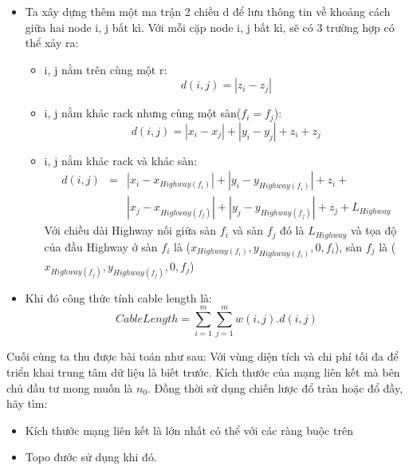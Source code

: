 \documentclass[../report.tex]{subfiles}
\begin{document}
\begin{itemize}
    \item Ta xây dựng thêm một ma trận 2 chiều d để lưu thông tin về khoảng cách giữa hai node i, j bất kì. Với mỗi cặp node i, j bất kì, sẽ có 3 trường hợp có thể xảy ra:
        \begin{itemize}
            \item i, j nằm trên cùng một r:
                \begin{equation}
                    d(i, j) = |z_i - z_j|
                \end{equation}
            \item i, j nằm khác rack nhưng cùng một sàn($f_i = f_j$): 
                \begin{equation}
                    d(i, j) = |x_i - x_j| + |y_i - y_j| + z_i + z_j
                \end{equation}
            \item i, j nằm khác rack và khác sàn:
                \begin{eqnarray*}
                    d(i, j) & =  & |x_i - x_{Highway(f_i)}| + |y_i - y_{Highway(f_i)}| + z_i + \\
                    &    & |x_j - x_{Highway(f_j)}| + |y_j - y_{Highway(f_j)}| + z_j + L_{Highway}	 
                \end{eqnarray*}
                Với chiều dài Highway nối giữa sàn $f_i$ và sàn $f_j$ đó là $L_{Highway}$ và tọa độ của đầu Highway ở sàn $f_i$ là ($x_{Highway(f_i)}, y_{Highway(f_i)}, 0, f_i$), sàn $f_j$ là ($x_{Highway(f_j)}, y_{Highway(f_j)}, 0, f_j$)
        \end{itemize}

    \item Khi đó công thức tính cable length là:
        \begin{equation} \label{cb}
            Cable Length = \sum_{i = 1}^m\sum_{j = 1}^mw(i,j).d(i, j)
        \end{equation}
\end{itemize}
Cuối cùng ta thu được bài toán như sau: Với vùng diện tích và chi phí tối đa để triển khai trung tâm dữ liệu là biết trước. Kích thước của mạng liên kết mà bên chủ đầu tư mong muốn là $n_0$. Đồng thời sử dụng chiến lược đổ tràn hoặc đổ đầy, hãy tìm:
\begin{itemize}
    \item Kích thước mạng liên kết là lớn nhất có thể với các ràng buộc trên
    \item Topo đước sử dụng khi đó.
\end{itemize}
\end{document}
